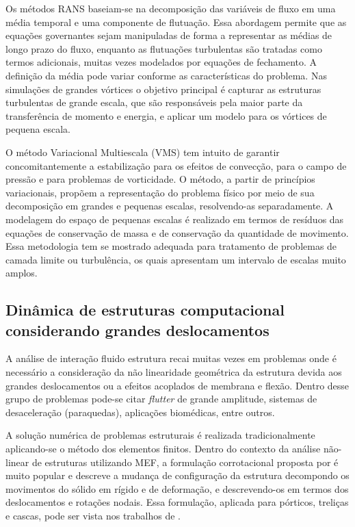\documentclass[tese_patricia.tex]{subfiles}
\begin{document}
Os métodos RANS baseiam-se na decomposição das variáveis de fluxo em uma média temporal e uma componente de flutuação. Essa abordagem permite que as equações governantes sejam manipuladas de forma a representar as médias de longo prazo do fluxo, enquanto as flutuações turbulentas são tratadas como termos adicionais, muitas vezes modelados por equações de fechamento. A definição da média pode variar conforme as características do problema. Nas simulações de grandes vórtices o objetivo principal é capturar as estruturas turbulentas de grande escala, que são responsáveis pela maior parte da transferência de momento e energia, e aplicar um modelo para os vórtices de pequena escala. 

O método Variacional Multiescala (VMS) \cite{Hughes:1995,Hughesetal:1998,Hughesetal:2001,BazilevsTT:2013} tem intuito de garantir concomitantemente a estabilização para os efeitos de convecção, para o campo de pressão e para problemas de vorticidade. O método, a partir de princípios variacionais, propõem a representação do problema físico por meio de sua decomposição em grandes e pequenas escalas, resolvendo-as separadamente.  A modelagem do espaço de pequenas escalas é realizado em termos de resíduos das equações de conservação de massa e de conservação da quantidade de movimento. Essa metodologia tem se mostrado adequada para tratamento de problemas de camada limite ou turbulência, os quais apresentam um intervalo de escalas muito amplos.


\subsection{Dinâmica de estruturas computacional considerando grandes deslocamentos}
\label{csdsection}

A análise de interação fluido estrutura recai muitas vezes em problemas onde é necessário a consideração da não linearidade geométrica da estrutura devida aos grandes deslocamentos ou a efeitos acoplados de membrana e flexão. Dentro desse grupo de problemas pode-se citar \textit{flutter} de grande amplitude, sistemas de desaceleração (paraquedas), aplicações biomédicas, entre outros.

A solução numérica de problemas estruturais é realizada tradicionalmente aplicando-se o método dos elementos finitos. Dentro do contexto da análise não-linear de estruturas utilizando MEF, a formulação corrotacional proposta por  é muito popular e descreve a mudança de configuração da estrutura decompondo os movimentos do sólido em rígido e de deformação, e descrevendo-os em termos dos deslocamentos e rotações nodais. Essa formulação, aplicada para pórticos, treliças e cascas, pode ser vista nos trabalhos de .
\end{document}
